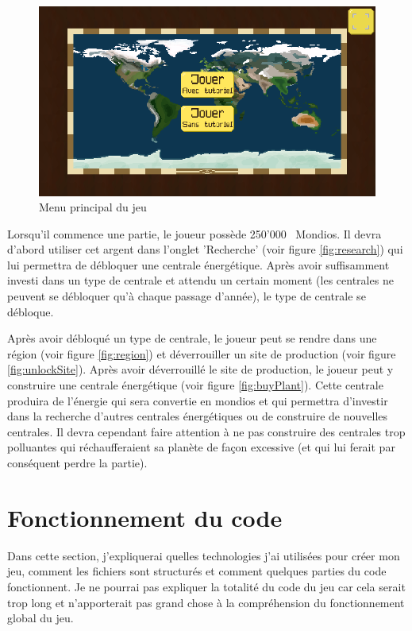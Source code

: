 \documentclass{article}
\newcommand{\initMoney}{250'000}
\begin{document}
        \begin{figure}[H]
                \includegraphics[width=\linewidth]{../images/mainMenu}
                \caption{Menu principal du jeu}
                \label{fig:mainMenu}
        \end{figure}
        
        Lorsqu'il commence une partie, le joueur possède \initMoney ~ Mondios. Il devra d'abord utiliser cet argent dans l'onglet 'Recherche' (voir figure \ref{fig:research}) qui lui permettra de débloquer une centrale énergétique. Après avoir suffisamment investi dans un type de centrale et attendu un certain moment (les centrales ne peuvent se débloquer qu'à chaque passage d'année), le type de centrale se débloque.
        
        
        Après avoir débloqué un type de centrale, le joueur peut se rendre dans une région (voir figure \ref{fig:region}) et déverrouiller un site de production (voir figure \ref{fig:unlockSite}). Après avoir déverrouillé le site de production, le joueur peut y construire une centrale énergétique (voir figure \ref{fig:buyPlant}). Cette centrale produira de l'énergie qui sera convertie en mondios et qui permettra d'investir dans la recherche d'autres centrales énergétiques ou de construire de nouvelles centrales. Il devra cependant faire attention à ne pas construire des centrales trop polluantes qui réchaufferaient sa planète de façon excessive (et qui lui ferait par conséquent perdre la partie).
        

        \section{Fonctionnement du code}
        Dans cette section, j'expliquerai quelles technologies j'ai utilisées pour créer mon jeu, comment les fichiers sont structurés et comment quelques parties du code fonctionnent. Je ne pourrai pas expliquer la totalité du code du jeu car cela serait trop long et n'apporterait pas grand chose à la compréhension du fonctionnement global du jeu. 
        
\end{document}
